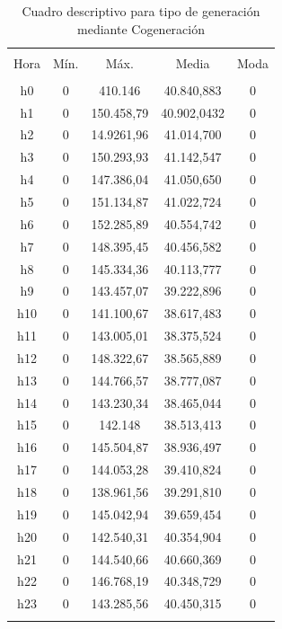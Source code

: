 \documentclass[conference, 10pt]{IEEEtran}
\begin{document}
\begin{table}[!htbp] \centering 
  \caption{Cuadro descriptivo para tipo de generación mediante Cogeneración} 
  \label{} 
\begin{tabular}{@{\extracolsep{5pt}} ccccc} 
\\[-1.8ex]\hline 
\hline \\[-1.8ex] 
Hora & Mín. & Máx. & Media & Moda \\ 
\hline \\[-1.8ex] 
h0 & 0 & 410.146 & 40.840,883 & 0 \\ 
h1 & 0 & 150.458,79 & 40.902,0432& 0 \\ 
h2 & 0 & 14.9261,96 & 41.014,700& 0 \\ 
h3 & 0 & 150.293,93 & 41.142,547& 0 \\ 
h4 & 0 & 147.386,04 & 41.050,650& 0 \\ 
h5 & 0 & 151.134,87 & 41.022,724& 0 \\ 
h6 & 0 & 152.285,89 & 40.554,742& 0 \\ 
h7 & 0 & 148.395,45 & 40.456,582& 0 \\ 
h8 & 0 & 145.334,36 & 40.113,777& 0 \\ 
h9 & 0 & 143.457,07 & 39.222,896& 0 \\ 
h10 & 0 & 141.100,67 & 38.617,483& 0 \\ 
h11 & 0 & 143.005,01 & 38.375,524& 0 \\ 
h12 & 0 & 148.322,67 & 38.565,889& 0 \\ 
h13 & 0 & 144.766,57 & 38.777,087& 0 \\ 
h14 & 0 & 143.230,34 & 38.465,044& 0 \\ 
h15 & 0 & 142.148 & 38.513,413& 0 \\ 
h16 & 0 & 145.504,87 & 38.936,497& 0 \\ 
h17 & 0 & 144.053,28 & 39.410,824& 0 \\ 
h18 & 0 & 138.961,56 & 39.291,810& 0 \\ 
h19 & 0 & 145.042,94 & 39.659,454& 0 \\ 
h20 & 0 & 142.540,31 & 40.354,904& 0 \\ 
h21 & 0 & 144.540,66 & 40.660,369& 0 \\ 
h22 & 0 & 146.768,19 & 40.348,729& 0 \\ 
h23 & 0 & 143.285,56 & 40.450,315& 0 \\ 
\hline \\[-1.8ex] 
\end{tabular} 
\label{tab_15}
\end{table}
\end{document}
